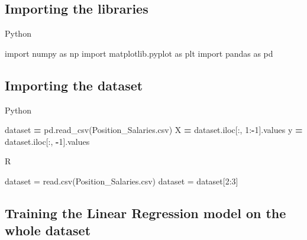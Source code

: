 \documentclass[
]{book}
\newenvironment{Shaded}{\begin{snugshade}}{\end{snugshade}}
\newcommand{\DecValTok}[1]{\textcolor[rgb]{0.00,0.00,0.81}{#1}}
\newcommand{\FunctionTok}[1]{\textcolor[rgb]{0.00,0.00,0.00}{#1}}
\newcommand{\ImportTok}[1]{#1}
\newcommand{\NormalTok}[1]{#1}
\newcommand{\OperatorTok}[1]{\textcolor[rgb]{0.81,0.36,0.00}{\textbf{#1}}}
\newcommand{\OtherTok}[1]{\textcolor[rgb]{0.56,0.35,0.01}{#1}}
\newcommand{\SpecialCharTok}[1]{\textcolor[rgb]{0.00,0.00,0.00}{#1}}
\newcommand{\StringTok}[1]{\textcolor[rgb]{0.31,0.60,0.02}{#1}}
\theoremstyle{definition}
\theoremstyle{definition}
\theoremstyle{definition}
\theoremstyle{definition}
\theoremstyle{remark}
\begin{document}
\hypertarget{importing-the-libraries-3}{%
\subsection{Importing the libraries}\label{importing-the-libraries-3}}

Python

\begin{Shaded}
\begin{Highlighting}[]
\ImportTok{import}\NormalTok{ numpy }\ImportTok{as}\NormalTok{ np}
\ImportTok{import}\NormalTok{ matplotlib.pyplot }\ImportTok{as}\NormalTok{ plt}
\ImportTok{import}\NormalTok{ pandas }\ImportTok{as}\NormalTok{ pd}
\end{Highlighting}
\end{Shaded}

\hypertarget{importing-the-dataset-3}{%
\subsection{Importing the dataset}\label{importing-the-dataset-3}}

Python

\begin{Shaded}
\begin{Highlighting}[]
\NormalTok{dataset }\OperatorTok{=}\NormalTok{ pd.read\_csv(}\StringTok{\textquotesingle{}Position\_Salaries.csv\textquotesingle{}}\NormalTok{)}
\NormalTok{X }\OperatorTok{=}\NormalTok{ dataset.iloc[:, }\DecValTok{1}\NormalTok{:}\OperatorTok{{-}}\DecValTok{1}\NormalTok{].values}
\NormalTok{y }\OperatorTok{=}\NormalTok{ dataset.iloc[:, }\OperatorTok{{-}}\DecValTok{1}\NormalTok{].values}
\end{Highlighting}
\end{Shaded}

R

\begin{Shaded}
\begin{Highlighting}[]
\NormalTok{dataset }\OtherTok{=} \FunctionTok{read.csv}\NormalTok{(}\StringTok{\textquotesingle{}Position\_Salaries.csv\textquotesingle{}}\NormalTok{)}
\NormalTok{dataset }\OtherTok{=}\NormalTok{ dataset[}\DecValTok{2}\SpecialCharTok{:}\DecValTok{3}\NormalTok{]}
\end{Highlighting}
\end{Shaded}

\hypertarget{training-the-linear-regression-model-on-the-whole-dataset}{%
\subsection{Training the Linear Regression model on the whole dataset}\label{training-the-linear-regression-model-on-the-whole-dataset}}
\end{document}
